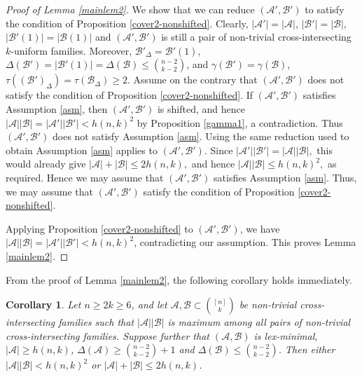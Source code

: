 \documentclass[a4paper,11pt]{article}
\newtheorem{corollary}[theorem]{Corollary}
\newcommand{\m}{\mathcal}
\begin{document}
\begin{proof}[Proof of Lemma \ref{mainlem2}]
We show that we can reduce $(\mathcal A',\mathcal B')$ to satisfy the condition of Proposition \ref{cover2-nonshifted}. 
Clearly, $|\mathcal A'|=|\mathcal A|$, $|\mathcal B'|=|\mathcal B|$, $|\mathcal B'(1)|=|\mathcal B(1)|$
and $(\mathcal A',\mathcal B')$ is still a pair of non-trivial
cross-intersecting $k$-uniform families. Moreover, $\mathcal B'_\Delta=\mathcal B'(1)$, $\Delta(\mathcal B')=|\mathcal B'(1)|
=\Delta(\mathcal B)\le {n-2\choose k-2}$, and $\gamma(\mathcal B')=\gamma(\mathcal B)$, $\tau((\mathcal B')_\Delta)=\tau(\mathcal B_\Delta)\ge2$.
Assume on the contrary that $(\mathcal A',\mathcal B')$ does not satisfy the condition of Proposition \ref{cover2-nonshifted}. If $(\mathcal A',\mathcal B')$ satisfies Assumption \ref{asm}, then $(\mathcal A',\mathcal B')$ is shifted, and hence $|\m A||\m B|=|\m A'||\m B'|<h(n,k)^2$ by Proposition \ref{gamma1}, a contradiction. Thus $(\mathcal A',\mathcal B')$ does not satisfy Assumption \ref{asm}. Using the same reduction used to obtain Assumption \ref{asm} applies to  $(\mathcal A',\mathcal B')$. Since
$|\mathcal A'||\mathcal B'|=|\mathcal A||\mathcal B|,$
this would already give $|\mathcal A|+|\mathcal B|\le 2h(n,k),$ and hence $|\mathcal A||\mathcal B|\le h(n,k)^2,$ as required. Hence we may assume that
$(\mathcal A',\mathcal B')$ satisfies Assumption \ref{asm}. Thus, we may assume that $(\mathcal A',\mathcal B')$ satisfy the condition of Proposition \ref{cover2-nonshifted}. 

Applying Proposition \ref{cover2-nonshifted} to $(\m A', \m B')$, 
we have $|\m A||\m B|=|\m A'||\m B'|< h(n,k)^2$, contradicting our assumption. This proves Lemma \ref{mainlem2}.
\end{proof}

From the proof of Lemma \ref{mainlem2}, the following corollary holds immediately.
\begin{corollary}\label{mainlem2-coro}
Let $n\ge 2k\ge 6$, and let $\mathcal{A}, \mathcal{B} \subset {[n]\choose k}$ be non-trivial cross-intersecting families such that $|\m A||\m B|$ is maximum among all pairs of non-trivial  cross-intersecting families.  
Suppose further that $(\m A, \m B)$ is lex-minimal, $|\m A|\ge h(n,k)$, $\Delta(\m A)\ge {n-2\choose k-2}+1$ and $\Delta(\m B)\le {n-2\choose k-2}$. Then either $|\m A||\m B|< h(n,k)^2$ or $|\m A|+|\m B|\le 2h(n,k)$. 
\end{corollary}
\end{document}
